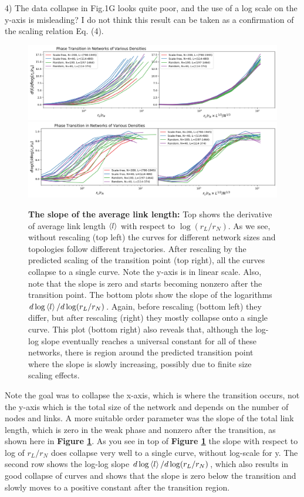 \documentclass[11pt]{article}
\begin{document}
\begin{response}{
4) The data collapse in Fig.1G looks quite poor, and the use of a log scale on the y-axis is misleading? I do not think this result can be taken as a confirmation of the scaling relation Eq. (4). 
}
\begin{figure}[ht]
    \centering
    \includegraphics[width=\textwidth]{fig-09-19/trans-collapse-dlog.png}
    \includegraphics[width=\textwidth]{fig-09-19/trans-collapse-dlog2.png}
    \caption{{\bf The slope of the average link length:} Top shows the derivative of average link length $\left<l\right>$ with respect to $\log(r_L/r_N)$. 
    As we see, without rescaling (top left) the curves for different network sizes and topologies follow different trajectories. 
    After rescaling by the predicted scaling of the transition point (top right), all the curves collapse to a single curve. 
    Note the y-axis is in linear scale. 
    Also, note that the slope is zero and starts becoming nonzero after the transition point. 
    The bottom plots show the slope of the logarithms $d \log \left<l\right>/d \log (r_L/r_N)$. 
    Again, before rescaling (bottom left) they differ, but after rescaling (right) they mostly collapse onto a single curve.
    This plot (bottom right) also reveals that, although the log-log slope eventually reaches a universal constant for all of these networks, there is region around the predicted transition point where the slope is slowly increasing, possibly due to finite size scaling effects.  
    }
    \label{fig:collapse}
\end{figure}

Note the goal was to collapse the x-axis, which is where the transition occurs, not the y-axis which is the total size of the network and depends on the number of nodes and links. 
A more suitable order parameter was the slope of the total link length, which is zero in the weak phase and nonzero after the transition, as shown here in {\bf Figure \ref{fig:collapse}}. 
As you see in top of {\bf Figure \ref{fig:collapse}} the slope with respect to log of $r_L/r_N$ does collapse very well to a single curve, without log-scale for y. 
The second row shows the log-log slope $d\log\left<l\right>/d\log(r_L/r_N)$, which also results in good collapse of curves and shows that the slope is zero below the transition and slowly moves to a positive constant after the transition region.   


\end{response}
\end{document}
